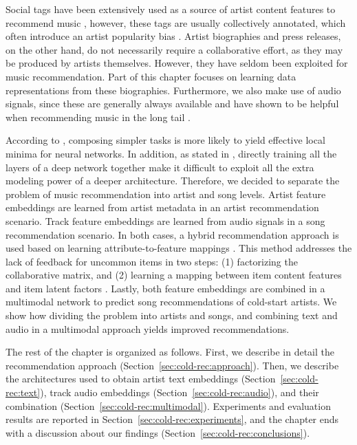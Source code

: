 Social tags have been extensively used as a source of artist content features to recommend music \citep{Knees2013}, however, these tags are usually collectively annotated, which often introduce an artist popularity bias \citep{Turnbull2008}.
Artist biographies and press releases, on the other hand, do not necessarily require a collaborative effort, as they may be produced by artists themselves. 
However, they have seldom been exploited for music recommendation.
Part of this chapter focuses on learning data representations from these biographies.
Furthermore, we also make use of audio signals, since these are generally always available and have shown to be helpful when recommending music in the long tail \citep{Oord2013}.

According to \cite{gulccehre2016knowledge}, composing simpler tasks is more likely to yield effective local minima for neural networks. In addition, as stated in \cite{larochelle2009exploring}, directly training all the layers of a deep network together make it difficult to exploit all the extra modeling power of a deeper architecture. 
Therefore, we decided to separate the problem of music recommendation into artist and song levels.
Artist feature embeddings are learned from artist metadata in an artist recommendation scenario.
Track feature embeddings are learned from audio signals in a song recommendation scenario.
In both cases, a hybrid recommendation approach is used based on learning attribute-to-feature mappings \citep{GantnerDFRS10}.
This method addresses the lack of feedback for uncommon items in two steps: (1) factorizing the collaborative matrix, and (2) learning a mapping between item content features and item latent factors \citep{Oord2013,bansal2016ask}.
Lastly, both feature embeddings are combined in a multimodal network to predict song recommendations of cold-start artists.
We show how dividing the problem into artists and songs, and combining text and audio in a multimodal approach yields improved recommendations.

The rest of the chapter is organized as follows. First, we describe in detail the recommendation approach (Section~\ref{sec:cold-rec:approach}). Then, we describe the architectures used to obtain artist text embeddings (Section~\ref{sec:cold-rec:text}), track audio embeddings (Section~\ref{sec:cold-rec:audio}), and their combination (Section~\ref{sec:cold-rec:multimodal}). Experiments and evaluation results are reported in Section~\ref{sec:cold-rec:experiments}, and the chapter ends with a discussion about our findings (Section~\ref{sec:cold-rec:conclusions}).


